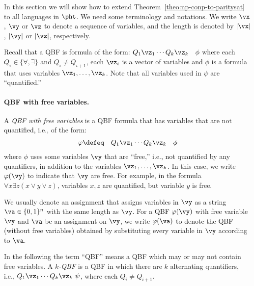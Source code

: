 \documentclass[11pt, a4paper]{article}
\begin{document}
In this section we will show how to extend Theorem~\ref{theo:np-conp-to-paritysat}
to all languages in $\pht$.
We need some terminology and notations.
We write $\vx$, $\vy$ or $\vz$ to denote a sequence of variables,
and the length is denoted by $|\vx|$, $|\vy|$ or $|\vz|$, respectively.

Recall that a QBF is formula of the form: 
$Q_1\vz_1\cdots Q_k\vz_k\quad \phi$
where each $Q_i \in \{\forall,\exists\}$ and $Q_i \neq Q_{i+1}$, each $\vz_i$ is a vector of variables
and $\phi$ is a formula that uses variables $\vz_1,\ldots,\vz_k$.
Note that all variables used in $\psi$ are ``quantified.''

\paragraph*{QBF with free variables.}
A {\em QBF with free variables} is a QBF formula that has variables that are not quantified, i.e.,
of the form: 
\begin{eqnarray*}
\varphi & \defeq &
Q_1\vz_1\cdots Q_k\vz_k\quad \phi
\end{eqnarray*}
where $\phi$ uses some variables $\vy$ that are ``free,'' i.e., not quantified by any quantifiers,
in addition to the variables $\vz_1,\ldots,\vz_k$.
In this case, we write $\varphi(\vy)$ to indicate that $\vy$ are free.
For example, in the formula $\forall x \exists z (x\vee y \vee z)$, variables $x,z$ are quantified,
but variable $y$ is free.

We usually denote an assignment that assigns variables in $\vy$ as a string $\va \in \{0,1\}^n$
with the same length as $\vy$.
For a QBF $\varphi(\vy)$ with free variable $\vy$ and $\va$ be an assignment on $\vy$,
we write $\varphi(\va)$ to denote the QBF (without free variables)
obtained by substituting every variable in $\vy$ according to $\va$.

In the following the term ``QBF'' means a QBF which may or may not contain free variables.
A {\em $k$-QBF} is a QBF in which there are $k$ alternating quantifiers, i.e.,
$Q_1\vz_1\cdots Q_k\vz_k\ \psi$, where each $Q_i\neq Q_{i+1}$.
\end{document}
